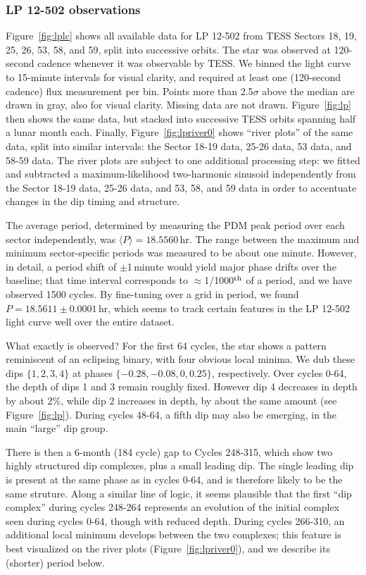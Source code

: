 \documentclass[11pt,twocolumn,tighten]{aastex63}
\begin{document}
\subsubsection{LP 12-502 observations}
\label{subsec:lpobservations}

Figure~\ref{fig:lplc} shows all available data for LP 12-502 from TESS
Sectors 18, 19, 25, 26, 53, 58, and 59, split into successive orbits.
The star was observed at 120-second cadence whenever it was observable
by TESS.  We binned the light curve to 15-minute intervals for visual
clarity, and required at least one (120-second cadence) flux
measurement per bin.  Points more than 2.5$\sigma$ above the median
are drawn in gray, also for visual clarity.  Missing data are not
drawn.  Figure~\ref{fig:lp} then shows the same data, but stacked into
successive TESS orbits spanning half a lunar month each.  Finally,
Figure~\ref{fig:lpriver0} shows ``river plots'' of the same data,
split into similar intervals: the Sector 18-19 data, 25-26 data, 53
data, and 58-59 data.  The river plots are subject to one additional
processing step: we fitted and subtracted a maximum-likelihood
two-harmonic sinusoid independently from the Sector 18-19 data, 25-26
data, and 53, 58, and 59 data in order to accentuate changes in the
dip timing and structure.

The average period, determined by measuring the PDM peak period over
each sector independently, was $\langle P \rangle = 18.5560$\,hr.  The
range between the maximum and minimum sector-specific periods was
measured to be about one minute.   However, in detail, a period shift
of $\pm$1\,minute would yield major phase drifts over the baseline;
that time interval corresponds to $\approx$1/1000$^{\rm th}$ of a
period, and we have observed 1500 cycles.  By fine-tuning over a grid
in period, we found $P=18.5611 \pm 0.0001$\,hr, which seems to track
certain features in the LP 12-502 light curve well over the entire
dataset.

What exactly is observed?  For the first 64 cycles, the star shows a
pattern reminiscent of an eclipsing binary, with four obvious local
minima.  We dub these dips $\{ 1, 2, 3, 4 \}$ at phases $\{ -0.28,
-0.08, 0, 0.25 \}$, respectively.  Over cycles 0-64, the depth of dips
1 and 3 remain roughly fixed.  However dip 4 decreases in depth by
about 2\%, while dip 2 increases in depth, by about the same amount
(see Figure~\ref{fig:lp}).  During cycles 48-64, a fifth dip may also
be emerging, in the main ``large'' dip group.

There is then a 6-month (184 cycle) gap to Cycles 248-315, which show
two highly structured dip complexes, plus a small leading dip.  The
single leading dip is present at the same phase as in cycles 0-64, and
is therefore likely to be the same struture.  Along a similar line of
logic, it seems plausible that the first ``dip complex'' during cycles
248-264 represents an evolution of the initial complex seen during
cycles 0-64, though with reduced depth.  During cycles 266-310, an
additional local minimum develops between the two complexes; this
feature is best visualized on the river plots
(Figure~\ref{fig:lpriver0}), and we describe its (shorter) period
below.
\end{document}
